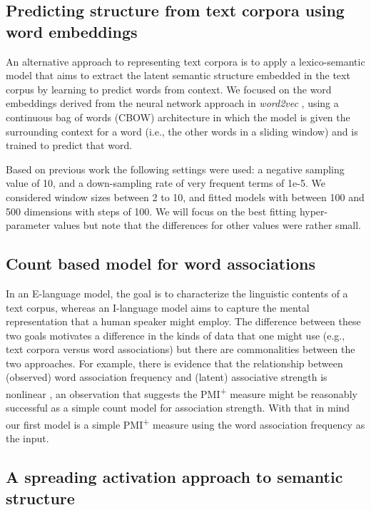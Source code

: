 \documentclass{article}
\begin{document}
\subsection{Predicting structure from text corpora using word embeddings}

An alternative approach to representing text corpora is to apply a  lexico-semantic model that aims to extract the latent semantic structure embedded in the text corpus by learning to predict words from context. We focused on the word embeddings derived from the neural network approach in {\it word2vec} \cite{mikolov2013efficient,LevyGoldberg2015}, using a continuous bag of words (CBOW) architecture in which the model is given the surrounding context for a word (i.e., the other words in a sliding window) and is trained to predict that word.

Based on previous work \cite{BaroniDinu2014,Mandera2016Semantic,LevyGoldberg2015} the following settings were used: a negative sampling value of 10, and a down-sampling rate of very frequent terms of 1e-5. We considered window sizes between 2 to 10, and fitted models with between 100 and 500 dimensions with steps of 100. We will focus on the best fitting hyper-parameter values but note that the differences for other values were rather small.



\subsection{Count based model for word associations}

In an E-language model, the goal is to characterize the linguistic contents of a text corpus, whereas an I-language model aims to capture  the mental representation that a human speaker might employ. The difference between these two goals motivates a difference in the kinds of data that one might use (e.g., text corpora versus word associations) but there are commonalities between the two approaches. For example, there is evidence that the relationship between (observed) word association frequency and (latent) associative strength is nonlinear \cite{Deese65}, an observation that suggests the PMI\textsuperscript{+} measure might be reasonably successful as a simple count model for association strength. With that in mind our first model is a simple PMI\textsuperscript{+} measure using the word association frequency as the input.


\subsection{A spreading activation approach to semantic structure}
\end{document}
